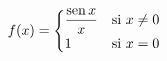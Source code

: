 \item $f(x) = \begin{cases} \dfrac{\operatorname{sen} x}{x} & \text{si } x \ne 0 \\ 1 & \text{si } x = 0 \end{cases}$
